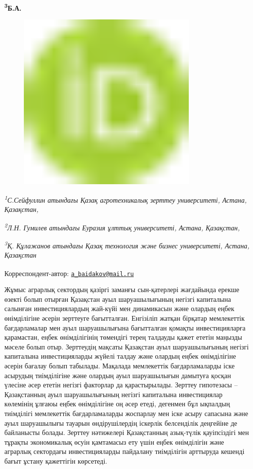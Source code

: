 {{\bfseries \textsuperscript{3}Б.А.
\begin{figure}[H]
	\centering
	\includegraphics[width=0.8\textwidth]{media/ekon/image1}
	\caption*{}
\end{figure}


\emph{\textsuperscript{1}С.Сейфуллин атындағы Қазақ агротехникалық
зерттеу университеті, Астана, Қазақстан,}

\emph{\textsuperscript{2}Л.Н. Гумилев атындағы Еуразия ұлттық
университеті, Астана, Қазақстан,}

\emph{\textsuperscript{3}Қ. Құлажанов атындағы Қазақ технология және
бизнес университеті, Астана, Қазақстан}

{\bfseries \textsuperscript{\envelope }}Корреспондент-автор:
\href{mailto:a_baidakov@mail.ru}{\nolinkurl{a\_baidakov@mail.ru}}

Жұмыс аграрлық сектордың қазіргі заманғы сын-қатерлері жағдайында ерекше
өзекті болып отырған Қазақстан ауыл шаруашылығының негізгі капиталына
салынған инвестициялардың жай-күйі мен динамикасын және олардың еңбек
өнімділігіне әсерін зерттеуге бағытталған. Енгізіліп жатқан бірқатар
мемлекеттік бағдарламалар мен ауыл шаруашылығына бағытталған қомақты
инвестицияларға қарамастан, еңбек өнімділігінің төмендігі терең талдауды
қажет ететін маңызды мәселе болып отыр. Зерттеудің мақсаты Қазақстан
ауыл шаруашылығының негізгі капиталына инвестицияларды жүйелі талдау
және олардың еңбек өнімділігіне әсерін бағалау болып табылады. Мақалада
мемлекеттік бағдарламаларды іске асырудың тиімділігіне және олардың ауыл
шаруашылығын дамытуға қосқан үлесіне әсер ететін негізгі факторлар да
қарастырылады. Зерттеу гипотезасы -- Қазақстанның ауыл шаруашылығының
негізгі капиталына инвестициялар көлемінің ұлғаюы еңбек өнімділігіне оң
әсер етеді, дегенмен бұл ықпалдың тиімділігі мемлекеттік бағдарламаларды
жоспарлау мен іске асыру сапасына және ауыл шаруашылығы тауарын
өндірушілердің іскерлік белсенділік деңгейіне де байланысты болады.
Зерттеу нәтижелері Қазақстанның азық-түлік қауіпсіздігі мен тұрақты
экономикалық өсуін қамтамасыз ету үшін еңбек өнімділігін және аграрлық
сектордағы инвестицияларды пайдалану тиімділігін арттыруда кешенді бағыт
ұстану қажеттігін көрсетеді.

}}
